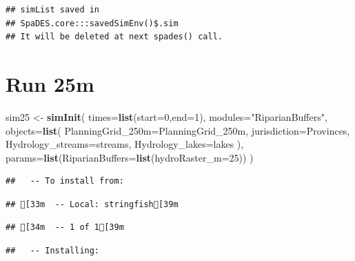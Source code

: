\documentclass[
]{article}
\newenvironment{Shaded}{\begin{snugshade}}{\end{snugshade}}
\newcommand{\AttributeTok}[1]{\textcolor[rgb]{0.13,0.29,0.53}{#1}}
\newcommand{\DecValTok}[1]{\textcolor[rgb]{0.00,0.00,0.81}{#1}}
\newcommand{\FunctionTok}[1]{\textcolor[rgb]{0.13,0.29,0.53}{\textbf{#1}}}
\newcommand{\NormalTok}[1]{#1}
\newcommand{\OtherTok}[1]{\textcolor[rgb]{0.56,0.35,0.01}{#1}}
\newcommand{\SpecialCharTok}[1]{\textcolor[rgb]{0.81,0.36,0.00}{\textbf{#1}}}
\newcommand{\StringTok}[1]{\textcolor[rgb]{0.31,0.60,0.02}{#1}}
\begin{document}
\begin{verbatim}
## simList saved in
## SpaDES.core:::savedSimEnv()$.sim
## It will be deleted at next spades() call.
\end{verbatim}

\begin{Shaded}
\end{Shaded}

\section{Run 25m}\label{run-25m}

\begin{Shaded}
\begin{Highlighting}[]
\NormalTok{sim25 }\OtherTok{\textless{}{-}} \FunctionTok{simInit}\NormalTok{(}
  \AttributeTok{times=}\FunctionTok{list}\NormalTok{(}\AttributeTok{start=}\DecValTok{0}\NormalTok{,}\AttributeTok{end=}\DecValTok{1}\NormalTok{),}
  \AttributeTok{modules=}\StringTok{"RiparianBuffers"}\NormalTok{,}
  \AttributeTok{objects=}\FunctionTok{list}\NormalTok{(}
    \AttributeTok{PlanningGrid\_250m=}\NormalTok{PlanningGrid\_250m,}
    \AttributeTok{jurisdiction=}\NormalTok{Provinces,}
    \AttributeTok{Hydrology\_streams=}\NormalTok{streams,}
    \AttributeTok{Hydrology\_lakes=}\NormalTok{lakes}
\NormalTok{  ),}
  \AttributeTok{params=}\FunctionTok{list}\NormalTok{(}\AttributeTok{RiparianBuffers=}\FunctionTok{list}\NormalTok{(}\AttributeTok{hydroRaster\_m=}\DecValTok{25}\NormalTok{))}
\NormalTok{)}
\end{Highlighting}
\end{Shaded}

\begin{verbatim}
##   -- To install from:
\end{verbatim}

\begin{verbatim}
## [33m  -- Local: stringfish[39m
\end{verbatim}

\begin{verbatim}
## [34m  -- 1 of 1[39m
\end{verbatim}

\begin{verbatim}
##   -- Installing:
\end{verbatim}
\end{document}

